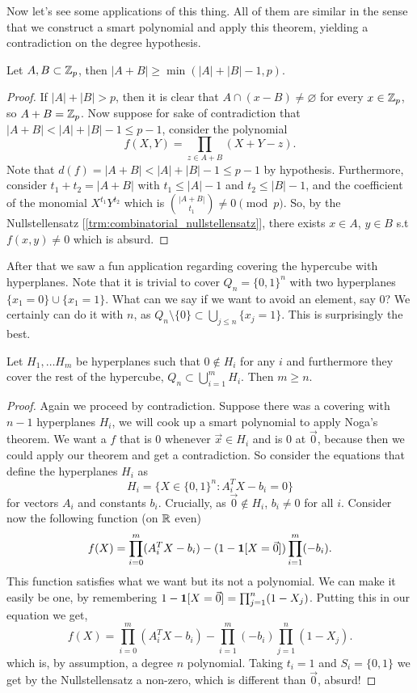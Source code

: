 Now let's see some applications of this thing. All of them are
similar in the sense that we construct a smart polynomial
and apply this theorem, yielding a contradiction on the degree hypothesis.

\begin{theorem}
	Let $A,B \subset \mathbb{Z}_p$, then $|A + B| \geq \min(|A| + |B| - 1, p)$.
\end{theorem}
\begin{proof}
	If $|A| + |B| > p$, then it is clear that $A \cap (x - B) \neq
	\varnothing$ for every $x \in \mathbb{Z}_p$,
	so $A + B = \mathbb{Z}_p$. Now suppose for sake of contradiction that $|A +
	B| < |A| + |B| - 1 \leq p - 1$,
	consider the polynomial
	\[
		f(X,Y) = \prod_{z \in A + B}(X + Y - z).
	\]
	Note that $d(f) = |A + B| < |A| + |B| - 1 \leq p - 1$ by hypothesis.
	Furthermore, consider
	$t_1 + t_2 = |A + B|$ with $t_1 \leq |A| - 1$ and $t_2 \leq |B| - 1$,
 and the coefficient
	of the monomial $X^{t_1}Y^{t_2}$ which is $\binom{|A + B|}{t_1} \neq
	0 \pmod p$. So,
	by the Nullstellensatz
	[\ref{trm:combinatorial_nullstellensatz}],
	there exists $x \in A$, $y \in B$ s.t $f(x,y) \neq 0$ which is absurd.
\end{proof}

After that we saw a fun application regarding covering the hypercube
with hyperplanes.
Note that it is trivial to cover $Q_n = \{0,1\}^n$ with two
hyperplanes $\{x_1 = 0\} \cup \{x_1 = 1\}$.
What can we say if we want to avoid an element, say $0$? We certainly
can do it with $n$,
as $Q_n \setminus \{0\} \subset \bigcup_{j \leq n} \{x_j = 1\}$. This
is surprisingly the best.

\begin{theorem}
	Let $H_1, \dots H_m$ be hyperplanes such that $0 \not \in H_i$ for any $i$ and
	furthermore they cover the rest of the hypercube, $Q_n \subset
	\bigcup_{i=1}^m H_i$.
	Then $m \geq n$.
\end{theorem}

\begin{proof}
	Again we proceed by contradiction. Suppose there was a covering with
	$n-1$ hyperplanes $H_i$,
	we will cook up a smart polynomial to apply Noga's theorem. We want
	a $f$ that is $0$
	whenever $\vec{x} \in H_i$ and is $0$ at $\vec{0}$, because then we
	could apply our
	theorem and get a contradiction. So consider the equations that
	define the hyperplanes $H_i$
	as
	\[
		H_i = \{X \in \{0,1\}^n : A_i^TX - b_i = 0\}
	\]
	for vectors $A_i$ and constants $b_i$. Crucially, as $\vec{0} \not
	\in H_i$, $b_i \neq 0$ for all $i$.
	Consider now the following function (on $\mathbb{R}$ even)
	\[
		f(X) = \prod_{i = 0}^{m} (A_i^T X - b_i)  - (1 - \bm{1}[X =
		\vec{0}])\prod_{i = 1}^m (-b_i).
	\]
	This function satisfies what we want but its not a polynomial. We
	can make it easily be one,
	by remembering $ 1 - \bm{1}[X = \vec{0}] = \prod_{j = 1}^n (1 - X_j)$.
	Putting this in our equation we get,
	\[
		f(X) = \prod_{i = 0}^{m} (A_i^T X - b_i)  - \prod_{i = 1}^m (-b_i)
		\prod_{j=1}^n (1 - X_j).
	\]
	which is, by assumption, a degree $n$ polynomial. Taking $t_i = 1$ and
	$S_i = \{0,1\}$ we get by the Nullstellensatz a non-zero, which is
	different than $\vec{0}$,
	absurd!
\end{proof}

